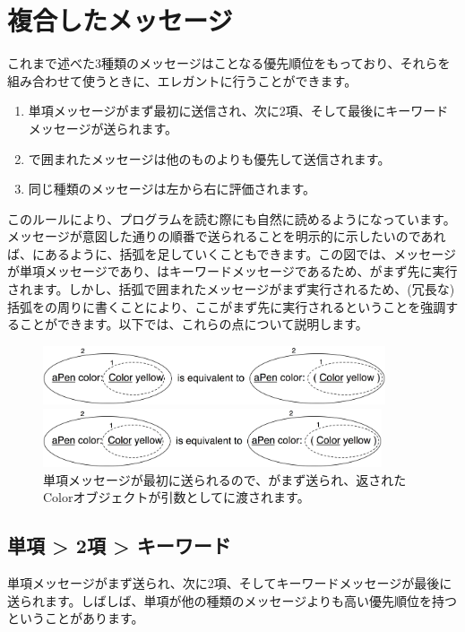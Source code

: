 \documentclass[a4paper,10pt,twoside]{book}
\begin{document}
\section{複合したメッセージ}
これまで述べた3種類のメッセージはことなる優先順位をもっており、それらを組み合わせて使うときに、エレガントに行うことができます。

\begin{enumerate}
\item 単項メッセージがまず最初に送信され、次に2項、そして最後にキーワードメッセージが送られます。
\item {}で囲まれたメッセージは他のものよりも優先して送信されます。
\item 同じ種類のメッセージは左から右に評価されます。
\end{enumerate}

このルールにより、プログラムを読む際にも自然に読めるようになっています。メッセージが意図した通りの順番で送られることを明示的に示したいのであれば、にあるように、括弧を足していくこともできます。この図では、メッセージが単項メッセージであり、はキーワードメッセージであるため、がまず先に実行されます。しかし、括弧で囲まれたメッセージがまず実行されるため、(冗長な)括弧をの周りに書くことにより、ここがまず先に実行されるということを強調することができます。以下では、これらの点について説明します。

\begin{figure}[ht]
\ifluluelse
	{\centerline{\includegraphics[width=0.9\textwidth]{uKeyUn}} }
	{\centerline{\includegraphics[width=10cm]{uKeyUn}} }
\caption{単項メッセージが最初に送られるので、がまず送られ、返されたColorオブジェクトが引数としてに渡されます。}
\end{figure}

\subsection*{単項 > 2項 > キーワード}
単項メッセージがまず送られ、次に2項、そしてキーワードメッセージが最後に送られます。しばしば、単項が他の種類のメッセージよりも高い優先順位を持つということがあります。
\end{document}
